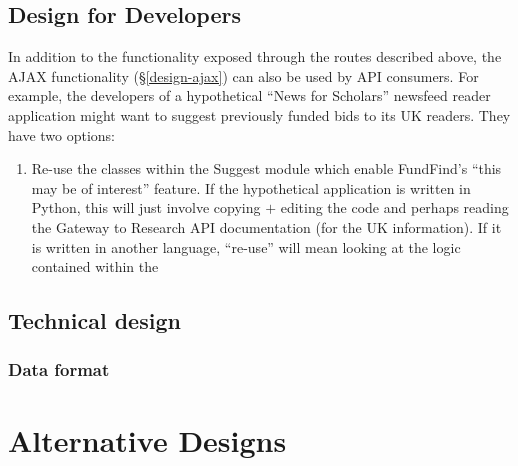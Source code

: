   \subsection{Design for Developers}
    
    In addition to the functionality exposed through the routes described above, the AJAX functionality (\S\ref{design-ajax}) can also be used by API consumers. For example, the developers of a hypothetical ``News for Scholars'' newsfeed reader application might want to suggest previously funded bids to its UK readers. They have two options:
    
    \begin{enumerate}
     \item Re-use the classes within the Suggest module which enable FundFind's ``this may be of interest'' feature. If the hypothetical application is written in Python, this will just involve copying $+$ editing the code and perhaps reading the Gateway to Research API documentation (for the UK information). If it is written in another language, ``re-use'' will mean looking at the logic contained within the 
    \end{enumerate}

  \subsection{Technical design}
  \label{api-tech-design}
  \subsubsection{Data format}
 
\section{Alternative Designs}